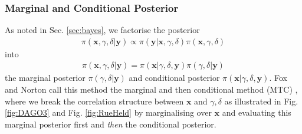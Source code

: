 \subsubsection{Marginal and Conditional Posterior}
\label{subsec:MTC}
As noted in Sec. \ref{sec:bayes}, we factorise the posterior
\begin{align}
	\pi( \bm{x}, \gamma, \delta| \bm{y}) \propto \pi(\bm{y}| \bm{x}, \gamma, \delta) \pi( \bm{x}, \gamma, \delta)
\end{align}
into 
\begin{align}
	\pi( \bm{x}, \gamma, \delta| \bm{y}) =\pi( \bm{x}|\gamma, \delta, \bm{y})\pi(\gamma, \delta | \bm{y})
\end{align}
the marginal posterior $\pi(\gamma, \delta | \bm{y})$ and conditional posterior $\pi( \bm{x}|\gamma, \delta, \bm{y})$.
Fox and Norton call this method the marginal and then conditional method (MTC) \cite{fox2016fast}, where we break the correlation structure between $\bm{x}$ and $\gamma, \delta$ as illustrated in Fig. \ref{fig:DAGO3} and Fig. \ref{fig:RueHeld} by marginalising over $\bm{x}$ and evaluating this marginal posterior first and \textit{then} the conditional posterior.

